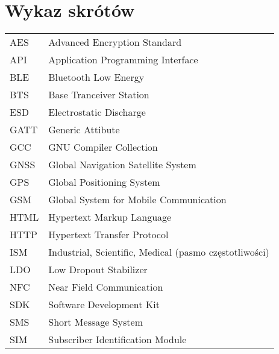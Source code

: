 \chapter*{Wykaz skrótów}

\begin{tabular}{l l}
AES & Advanced Encryption Standard \\
API & Application Programming Interface \\
BLE & Bluetooth Low Energy \\
BTS & Base Tranceiver Station \\
ESD & Electrostatic Discharge \\
GATT & Generic Attibute \\
GCC & GNU Compiler Collection \\
GNSS & Global Navigation Satellite System \\
GPS & Global Positioning System \\
GSM & Global System for Mobile Communication \\
HTML & Hypertext Markup Language \\
HTTP & Hypertext Transfer Protocol \\
ISM & Industrial, Scientific, Medical (pasmo częstotliwości) \\
LDO & Low Dropout Stabilizer \\
NFC & Near Field Communication \\
SDK & Software Development Kit \\
SMS & Short Message System \\
SIM & Subscriber Identification Module \\



\end{tabular}
